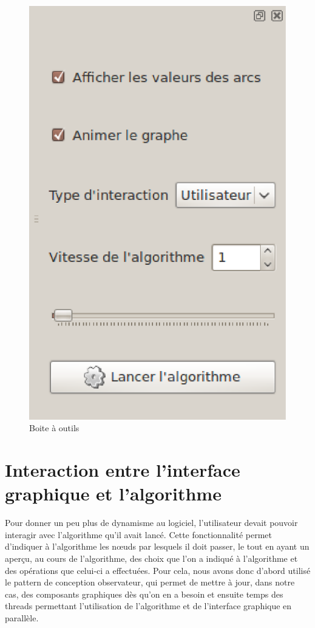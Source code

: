 \documentclass[11pt,a4paper]{article}
\begin{document}
\begin{figure}[h!]
\begin{minipage}[b]{0.5\linewidth}
					\includegraphics[scale=0.6]{toolBox.eps}
					\caption{Boite à outils}
					\label{img_boite_outil}
				\end{minipage}
			\end{figure}
			
	\newpage
	\section{Interaction entre l'interface graphique et l'algorithme}
		Pour donner un peu plus de dynamisme au logiciel, l'utilisateur devait pouvoir interagir avec l'algorithme qu'il avait lancé. Cette fonctionnalité permet d'indiquer à l'algorithme les n\oe uds par lesquels il doit passer, le tout en ayant un aperçu, au cours de l'algorithme, des choix que l'on a indiqué à l'algorithme et des opérations que celui-ci a effectuées. Pour cela, nous avons donc d'abord utilisé le pattern de conception observateur, qui permet de mettre à jour, dans notre cas, des composants graphiques dès qu'on en a besoin et ensuite temps des threads permettant l'utilisation de l'algorithme et de l'interface graphique en parallèle.
\end{document}
